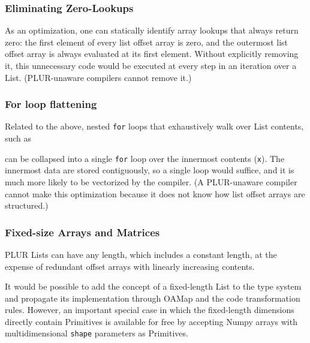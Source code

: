 \documentclass[10pt, conference, compsocconf]{IEEEtran}
\begin{document}
\subsubsection{Eliminating Zero-Lookups}

As an optimization, one can statically identify array lookups that always return zero: the first element of every list offset array is zero, and the outermost list offset array is always evaluated at its first element. Without explicitly removing it, this unnecessary code would be executed at every step in an iteration over a List. (PLUR-unaware compilers cannot remove it.)

\subsubsection{For loop flattening}

Related to the above, nested {\tt for} loops that exhaustively walk over List contents, such as
\begin{center}
\begin{minipage}{0.8\linewidth}

\end{minipage}
\end{center}
can be collapsed into a single {\tt for} loop over the innermost contents ({\tt x}). The innermost data are stored contiguously, so a single loop would suffice, and it is much more likely to be vectorized by the compiler. (A PLUR-unaware compiler cannot make this optimization because it does not know how list offset arrays are structured.)

\subsubsection{Fixed-size Arrays and Matrices}

PLUR Lists can have any length, which includes a constant length, at the expense of redundant offset arrays with linearly increasing contents.

It would be possible to add the concept of a fixed-length List to the type system and propagate its implementation through OAMap and the code transformation rules. However, an important special case in which the fixed-length dimensions directly contain Primitives is available for free by accepting Numpy arrays with multidimensional {\tt shape} parameters as Primitives.
\end{document}
